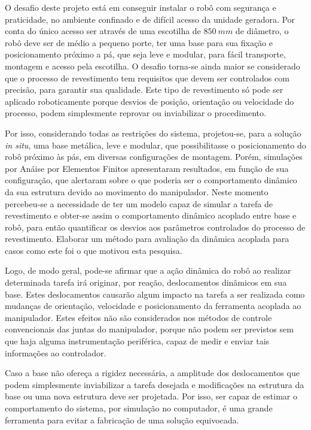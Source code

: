 O desafio deste projeto está em conseguir instalar o robô com segurança e
praticidade, no ambiente confinado e de difícil acesso da unidade geradora. Por
conta do único acesso ser através de uma escotilha de $850~mm$ de diâmetro, o
robô deve ser de médio a pequeno porte, ter uma base para sua fixação e
posicionamento próximo a pá, que seja leve e modular, para fácil transporte,
montagem e acesso pela escotilha. O desafio torna-se ainda maior se considerado
que o processo de revestimento tem requisitos que devem ser controlados com
precisão, para garantir sua qualidade. Este tipo de revestimento só pode ser
aplicado roboticamente porque desvios de posição, orientação ou velocidade do
processo, podem simplesmente reprovar ou inviabilizar o procedimento.

Por isso, considerando todas as restrições do sistema, projetou-se, para a
solução \textit{in situ}, uma base metálica, leve e modular, que possibilitasse
o posicionamento do robô próximo às pás, em diversas configurações de montagem.
Porém, simulações por Anáise por Elementos Finitos apresentaram resultados, em
função de sua configuração, que alertaram sobre o que poderia ser o
comportamento dinâmico da sua estrutura devido ao movimento do manipulador.
Neste momento percebeu-se a necessidade de ter um modelo capaz de simular a
tarefa de revestimento e obter-se assim o comportamento dinâmico acoplado entre
base e robô, para então quantificar os desvios aos parâmetros controlados do
processo de revestimento. Elaborar um método para avaliação da dinâmica acoplada
para casos como este foi o que motivou esta pesquisa.

Logo, de modo geral, pode-se afirmar que a ação dinâmica do robô ao realizar
determinada tarefa irá originar, por reação, deslocamentos dinâmicos em sua
base. Estes deslocamentos causarão algum impacto na tarefa a ser realizada como
mudanças de orientação, velocidade e posicionamento da ferramenta acoplada ao
manipulador. Estes efeitos não são considerados nos métodos de controle
convencionais das juntas do manipulador, porque não podem ser previstos sem que
haja alguma instrumentação periférica, capaz de medir e enviar tais informações
ao controlador.

Caso a base não ofereça a rigidez necessária, a amplitude dos deslocamentos que
podem simplesmente inviabilizar a tarefa desejada e modificações na estrutura da
base ou uma nova estrutura deve ser projetada. Por isso, ser capaz de estimar o
comportamento do sistema, por simulação no computador, é uma grande ferramenta
para evitar a fabricação de uma solução equivocada.


